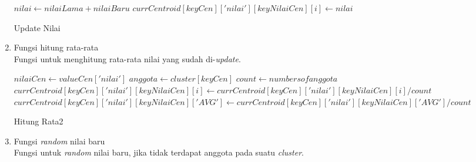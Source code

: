 \begin{enumerate}
        \begin{algorithm}[H]
            \begin{algorithmic}[1]
                  \State $nilai \gets nilaiLama+nilaiBaru$
                  \State $currCentroid[keyCen]['nilai'][keyNilaiCen][i] \gets nilai$
                \EndProcedure
            \end{algorithmic} 
            \caption{Update Nilai}
            \label{alg:updateNilai}
        \end{algorithm}
        
    \item Fungsi hitung rata-rata \\
        Fungsi untuk menghitung rata-rata nilai yang sudah di-\textit{update}.\\
        
        \begin{algorithm}[H]
            \begin{algorithmic}[1]
                        \State $nilaiCen \gets valueCen['nilai']$
                        \State $anggota \gets cluster[keyCen]$
                        \State $count \gets numbers of anggota$
                                    \State $currCentroid[keyCen]['nilai'][keyNilaiCen][i] \gets currCentroid[keyCen]['nilai'][keyNilaiCen][i]/count$
                                \EndFor
                                $currCentroid[keyCen]['nilai'][keyNilaiCen]['AVG'] \gets currCentroid[keyCen]['nilai'][keyNilaiCen]['AVG']/count$
                            \EndFor
                        \EndIf
                    \EndFor
                \EndProcedure
            \end{algorithmic} 
            \caption{Hitung Rata2}
            \label{alg:hitungRata2}
        \end{algorithm}
    
    \item Fungsi \textit{random} nilai baru \\
    
        Fungsi untuk \textit{random} nilai baru, jika tidak terdapat anggota pada suatu \textit{cluster}. \\
        

\end{enumerate}
